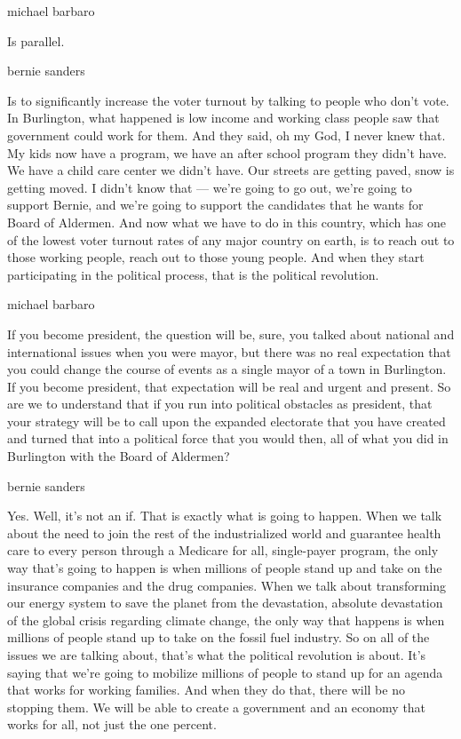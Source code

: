 michael barbaro

Is parallel.

bernie sanders

Is to significantly increase the voter turnout by talking to people who
don't vote. In Burlington, what happened is low income and working class
people saw that government could work for them. And they said, oh my
God, I never knew that. My kids now have a program, we have an after
school program they didn't have. We have a child care center we didn't
have. Our streets are getting paved, snow is getting moved. I didn't
know that --- we're going to go out, we're going to support Bernie, and
we're going to support the candidates that he wants for Board of
Aldermen. And now what we have to do in this country, which has one of
the lowest voter turnout rates of any major country on earth, is to
reach out to those working people, reach out to those young people. And
when they start participating in the political process, that is the
political revolution.

michael barbaro

If you become president, the question will be, sure, you talked about
national and international issues when you were mayor, but there was no
real expectation that you could change the course of events as a single
mayor of a town in Burlington. If you become president, that expectation
will be real and urgent and present. So are we to understand that if you
run into political obstacles as president, that your strategy will be to
call upon the expanded electorate that you have created and turned that
into a political force that you would then, all of what you did in
Burlington with the Board of Aldermen?

bernie sanders

Yes. Well, it's not an if. That is exactly what is going to happen. When
we talk about the need to join the rest of the industrialized world and
guarantee health care to every person through a Medicare for all,
single-payer program, the only way that's going to happen is when
millions of people stand up and take on the insurance companies and the
drug companies. When we talk about transforming our energy system to
save the planet from the devastation, absolute devastation of the global
crisis regarding climate change, the only way that happens is when
millions of people stand up to take on the fossil fuel industry. So on
all of the issues we are talking about, that's what the political
revolution is about. It's saying that we're going to mobilize millions
of people to stand up for an agenda that works for working families. And
when they do that, there will be no stopping them. We will be able to
create a government and an economy that works for all, not just the one
percent.

